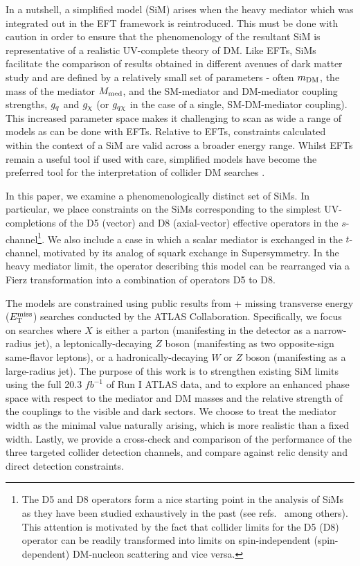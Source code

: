 In a nutshell, a simplified model (SiM) arises when the heavy mediator which was integrated out in the EFT framework is reintroduced. This must be done with caution in order to ensure that the phenomenology of the resultant SiM is representative of a realistic UV-complete theory of DM.
%
Like EFTs, SiMs facilitate the comparison of results obtained in  different avenues of dark matter study \cite{DiFranzo:2013vra, Buckley:2014fba} and are defined by a relatively small set of parameters - often $m_{\mathrm{DM}}$, the mass of the mediator $M_{\mathrm{med}}$, and the SM-mediator and DM-mediator coupling strengths, $g_q$ and $g_{\chi}$ (or $g_{q \chi}$ in the case of a single, SM-DM-mediator coupling). This increased parameter space makes it challenging to scan as wide a range of models as can be done with EFTs.
Relative to EFTs, constraints calculated within the context of a SiM are valid across a broader energy range. 
%
Whilst EFTs remain a useful tool if used with care, simplified models have become the preferred tool for the interpretation of collider DM searches \cite{DM_MET_LHC, DMOxfordReport, DMForumReport, Harris:2014hga,Buchmueller:2014yoa}.


In this paper, we examine a phenomenologically distinct set of SiMs. In particular, we place constraints on the SiMs corresponding to the simplest UV-completions of the D5 (vector) and D8 (axial-vector) effective operators in the $s$-channel\footnote{The D5 and D8 operators form a nice starting point in the analysis of SiMs as they have been studied exhaustively in the past (see refs.~\cite{Aad:1363019, ATLAS-CONF-2012-147, CMS-PAS-EXO-12-048, Buckley:2013jwa, Abdallah:1472683, MonoX, ValidEFT, ValidEFT_part2, ValidEFT_part3} among others). This attention is motivated by the fact that collider limits for the D5 (D8) operator can be readily transformed into limits on spin-independent (spin-dependent) DM-nucleon scattering and vice versa.}. We also include a case in which a scalar mediator is exchanged in the $t$-channel, motivated by its analog of squark exchange in Supersymmetry. In the heavy mediator limit, the operator describing this model can be rearranged via a Fierz transformation into a combination of operators D5 to D8.

The models are constrained using public results from \monoX + missing transverse energy ($E_{\mathrm{T}}^{\mathrm{miss}}$) searches conducted by the ATLAS Collaboration. Specifically, we focus on searches where $X$ is either a parton (manifesting in the detector as a narrow-radius jet), a leptonically-decaying $Z$ boson (manifesting as two opposite-sign same-flavor leptons), or a hadronically-decaying $W$ or $Z$ boson (manifesting as a large-radius jet). The purpose of this work is to strengthen existing SiM limits using the full 20.3 $fb^{-1}$ of Run I ATLAS data, and to explore an enhanced phase space with respect to the mediator and DM masses and the relative strength of the couplings to the visible and dark sectors. We choose to treat the mediator width as the minimal value naturally arising, which is more realistic than a fixed width. Lastly, we provide a cross-check and comparison of the performance of the three targeted collider detection channels, and compare against relic density and direct detection constraints.

